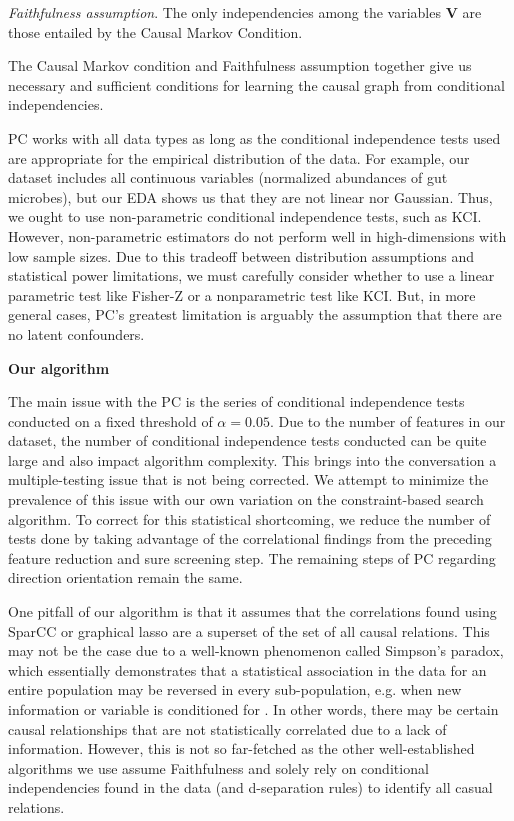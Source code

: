 \documentclass[12pt,letterpaper]{article}
\begin{document}
\textit{Faithfulness assumption}. The only independencies among the variables $\textbf{V}$ are those entailed by the Causal Markov Condition.

The Causal Markov condition and Faithfulness assumption together give us necessary and sufficient conditions for learning the causal graph from conditional independencies. 

PC works with all data types as long as the conditional independence tests used are appropriate for the empirical distribution of the data. For example, our dataset includes all continuous variables (normalized abundances of gut microbes), but our EDA shows us that they are not linear nor Gaussian. Thus, we ought to use non-parametric conditional independence tests, such as KCI. However, non-parametric estimators do not perform well in high-dimensions with low sample sizes. Due to this tradeoff between distribution assumptions and statistical power limitations, we must carefully consider whether to use a linear parametric test like Fisher-Z or a nonparametric test like KCI. But, in more general cases, PC’s greatest limitation is arguably the assumption that there are no latent confounders. \newline

\textbf{Our algorithm}

The main issue with the PC is the series of conditional independence tests conducted on a fixed threshold of $\alpha = 0.05$. Due to the number of features in our dataset, the number of conditional independence tests conducted can be quite large and also impact algorithm complexity. This brings into the conversation a multiple-testing issue that is not being corrected. We attempt to minimize the prevalence of this issue with our own variation on the constraint-based search algorithm. To correct for this statistical shortcoming, we reduce the number of tests done by taking advantage of the correlational findings from the preceding feature reduction and sure screening step. The remaining steps of PC regarding direction orientation remain the same. 

One pitfall of our algorithm is that it assumes that the correlations found using SparCC or graphical lasso are a superset of the set of all causal relations. This may not be the case due to a well-known phenomenon called Simpson’s paradox, which essentially demonstrates that a statistical association in the data for an entire population may be reversed in every sub-population, e.g. when new information or variable is conditioned for \citep{pearl2016primer}. In other words, there may be certain causal relationships that are not statistically correlated due to a lack of information. However, this is not so far-fetched as the other well-established algorithms we use assume Faithfulness and solely rely on conditional independencies found in the data (and d-separation rules) to identify all casual relations. \newline
\end{document}
